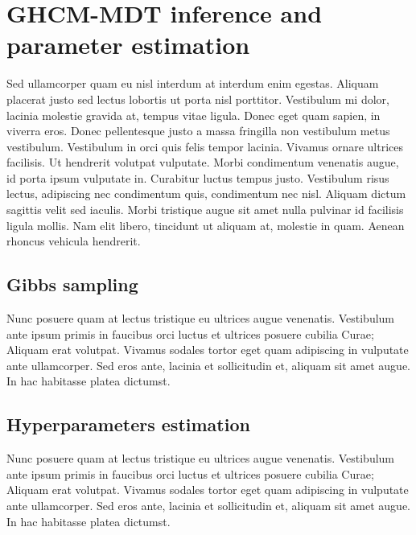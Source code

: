 
\section{GHCM-MDT inference and parameter estimation}

Sed ullamcorper quam eu nisl interdum at interdum enim egestas. Aliquam placerat justo sed lectus lobortis ut porta nisl porttitor. Vestibulum mi dolor, lacinia molestie gravida at, tempus vitae ligula. Donec eget quam sapien, in viverra eros. Donec pellentesque justo a massa fringilla non vestibulum metus vestibulum. Vestibulum in orci quis felis tempor lacinia. Vivamus ornare ultrices facilisis. Ut hendrerit volutpat vulputate. Morbi condimentum venenatis augue, id porta ipsum vulputate in. Curabitur luctus tempus justo. Vestibulum risus lectus, adipiscing nec condimentum quis, condimentum nec nisl. Aliquam dictum sagittis velit sed iaculis. Morbi tristique augue sit amet nulla pulvinar id facilisis ligula mollis. Nam elit libero, tincidunt ut aliquam at, molestie in quam. Aenean rhoncus vehicula hendrerit.

\subsection{Gibbs sampling}

Nunc posuere quam at lectus tristique eu ultrices augue venenatis. Vestibulum ante ipsum primis in faucibus orci luctus et ultrices posuere cubilia Curae; Aliquam erat volutpat. Vivamus sodales tortor eget quam adipiscing in vulputate ante ullamcorper. Sed eros ante, lacinia et sollicitudin et, aliquam sit amet augue. In hac habitasse platea dictumst.

\subsection{Hyperparameters estimation}

Nunc posuere quam at lectus tristique eu ultrices augue venenatis. Vestibulum ante ipsum primis in faucibus orci luctus et ultrices posuere cubilia Curae; Aliquam erat volutpat. Vivamus sodales tortor eget quam adipiscing in vulputate ante ullamcorper. Sed eros ante, lacinia et sollicitudin et, aliquam sit amet augue. In hac habitasse platea dictumst.


